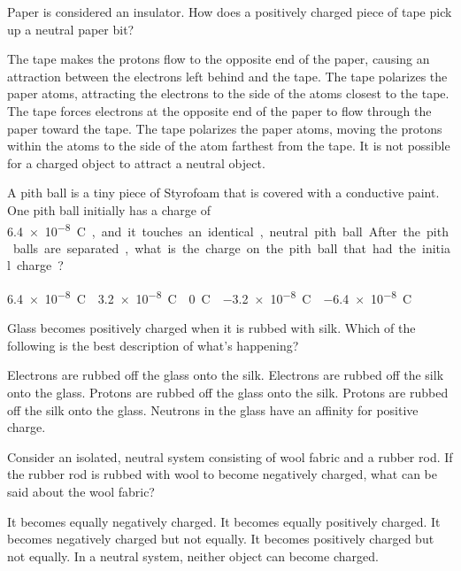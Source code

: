 \documentclass{../../oss-apphys-exam}
\begin{document}




\begin{questions}
  \classkickMCinstructions
  
  \question Paper is considered an insulator. How does a positively charged
  piece of tape pick up a neutral paper bit?
  \begin{choices}
    \choice The tape makes the protons flow to the opposite end of the paper,
    causing an attraction between the electrons left behind and the tape.
    \choice The tape polarizes the paper atoms, attracting the electrons to the
    side of the atoms closest to the tape.
    \choice The tape forces electrons at the opposite end of the paper to flow
    through the paper toward the tape.
    \choice The tape polarizes the paper atoms, moving the protons within the
    atoms to the side of the atom farthest from the tape.
    \choice It is not possible for a charged object to attract a neutral object.
  \end{choices}


  
  \question A pith ball is a tiny piece of Styrofoam that is covered with a
  conductive paint. One pith ball initially has a charge of \SI{6.4e-8}\coulomb,
  and it touches an identical, neutral pith ball. After the pith balls are
  separated, what is the charge on the pith ball that had the initial charge?
  \begin{choices}
    \choice\SI{6.4e-8}\coulomb
    \choice\SI{3.2e-8}\coulomb
    \choice\SI{0}\coulomb
    \choice\SI{-3.2e-8}\coulomb
    \choice\SI{-6.4e-8}\coulomb
  \end{choices}

  \question Glass becomes positively charged when it is rubbed with silk. Which
  of the following is the best description of what's happening?
  \begin{choices}
    \choice Electrons are rubbed off the glass onto the silk.
    \choice Electrons are rubbed off the silk onto the glass.
    \choice Protons are rubbed off the glass onto the silk.
    \choice Protons are rubbed off the silk onto the glass.
    \choice Neutrons in the glass have an affinity for positive charge.
  \end{choices}

  \question Consider an isolated, neutral system consisting of wool fabric and a
  rubber rod. If the rubber rod is rubbed with wool to become negatively
  charged, what can be said about the wool fabric?
  \begin{choices}
    \choice It becomes equally negatively charged.
    \choice It becomes equally positively charged.
    \choice It becomes negatively charged but not equally.
    \choice It becomes positively charged but not equally.
    \choice In a neutral system, neither object can become charged.
  \end{choices}


\end{questions}
\end{document}
